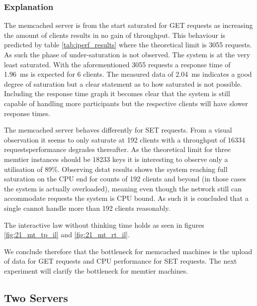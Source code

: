         \subsubsection{Explanation}

            The memcached server is from the start saturated for GET requests as increasing the amount of clients
            results in no gain of throughput. This behaviour is predicted by table \ref{tab:iperf_results} where the
            theoretical limit is 3055 requests. As such the phase of under-saturation is not observed. The system is at
            the very least saturated.  With the aforementioned 3055 requests a response time of \SI{1.96}{\milli\second}
            is expected for 6 clients. The measured data of \SI{2.04}{\milli\second} indicates a good degree of
            saturation but a clear statement as to how saturated is not possible. Including the response time graph it
            becomes clear that the system is still capable of handling more participants but the respective clients will
            have slower response times.

            The memcached server behaves differently for SET requests. From a visual observation it seems to only
            saturate at 192 clients with a throughput of 16334 requests\textemdash performance degrades thereafter.  As
            the theoretical limit for three memtier instances should be 18233 keys it is interesting to observe only a
            utilisation of 89\%. Observing dstat results shows the system reaching full saturation on the CPU end for
            counts of 192 clients and beyond (in those cases the system is actually overloaded), meaning even though the
            network still can accommodate requests the system is CPU bound. As such it is concluded that a single \srv{}
            cannot handle more than 192 clients reasonably.

            The interactive law without thinking time holds as seen in figures \ref{fig:21_mt_tp_il} and
            \ref{fig:21_mt_rt_il}.

            We conclude therefore that the bottleneck for memcached machines is the upload of data for GET requests and
            CPU performance for SET requests. The next experiment will clarify the bottleneck for memtier machines.

    \subsection{Two Servers\label{subsec:2_two-servers}}

